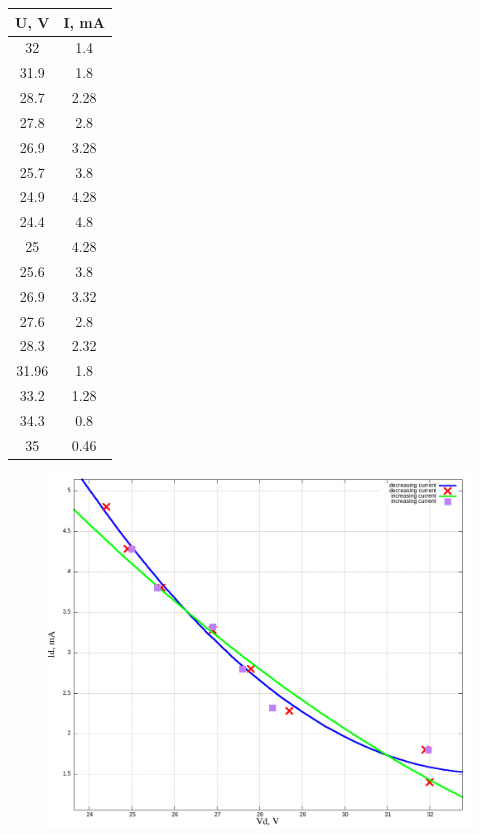 \documentclass{article}
\begin{document}
\begin{table}[H]
    \centering
    \begin{tabular}{|c|c|}
    \hline
    U, V  & I, mA \\\hline
    32    & 1.4   \\\hline
    31.9  & 1.8   \\\hline
    28.7  & 2.28  \\\hline
    27.8  & 2.8   \\\hline
    26.9  & 3.28  \\\hline
    25.7  & 3.8   \\\hline
    24.9  & 4.28  \\\hline
    24.4  & 4.8   \\\hline
    25    & 4.28  \\\hline
    25.6  & 3.8   \\\hline
    26.9  & 3.32  \\\hline
    27.6  & 2.8   \\\hline
    28.3  & 2.32  \\\hline
    31.96 & 1.8   \\\hline
    33.2  & 1.28  \\\hline
    34.3  & 0.8   \\\hline
    35    & 0.46  \\\hline
    \end{tabular}
\end{table}

\begin{figure}[H]
    \centering
    \includegraphics[width=\textwidth]{V-A-1.png}
\end{figure}
\end{document}
